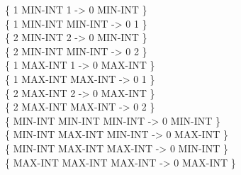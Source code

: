 \begin{tt}
\{       1 MIN-INT        1  ->  0 MIN-INT \} \\
\{       1 MIN-INT  MIN-INT  ->  0       1 \} \\
\{       2 MIN-INT        2  ->  0 MIN-INT \} \\
\{       2 MIN-INT  MIN-INT  ->  0       2 \} \\
\{       1 MAX-INT        1  ->  0 MAX-INT \} \\
\{       1 MAX-INT  MAX-INT  ->  0       1 \} \\
\{       2 MAX-INT        2  ->  0 MAX-INT \} \\
\{       2 MAX-INT  MAX-INT  ->  0       2 \} \\
\{ MIN-INT MIN-INT  MIN-INT  ->  0 MIN-INT \} \\
\{ MIN-INT MAX-INT  MIN-INT  ->  0 MAX-INT \} \\
\{ MIN-INT MAX-INT  MAX-INT  ->  0 MIN-INT \} \\
\{ MAX-INT MAX-INT  MAX-INT  ->  0 MAX-INT \}


\end{tt}
